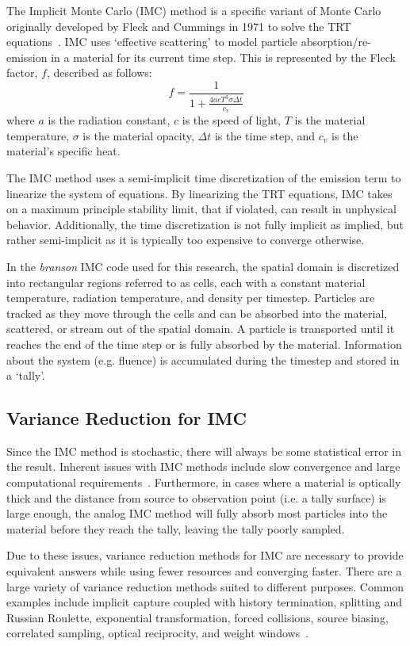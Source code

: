 The Implicit Monte Carlo (IMC) method is a specific variant of Monte Carlo originally developed by Fleck and Cummings in 1971 to solve the TRT equations~\cite{FC71}. IMC uses `effective scattering' to model particle absorption/re-emission in a material for its current time step. This is represented by the Fleck factor, $f$, described as follows:
\begin{equation}
f = \frac{1}{1 + \frac{4acT^{3}\sigma \Delta t}{c_{v}}}
\end{equation}
where $a$ is the radiation constant, $c$ is the speed of light, $T$ is the material temperature, $\sigma$ is the material opacity, $\Delta t$ is the time step, and $c_{v}$ is the material's specific heat.

The IMC method uses a semi-implicit time discretization of the emission term to linearize the system of equations. By linearizing the TRT equations, IMC takes on a maximum principle stability limit, that if violated, can result in unphysical behavior. Additionally, the time discretization is not fully implicit as implied, but rather semi-implicit as it is typically too expensive to converge otherwise.

In the \textit{branson} IMC code used for this research, the spatial domain is discretized into rectangular regions referred to as cells, each with a constant material temperature, radiation temperature, and density per timestep. Particles are tracked as they move through the cells and can be absorbed into the material, scattered, or stream out of the spatial domain. A particle is transported until it reaches the end of the time step or is fully absorbed by the material. Information about the system (e.g. fluence) is accumulated during the timestep and stored in a `tally'.

\subsection{Variance Reduction for IMC} \label{Sec: variance reduction}
Since the IMC method is stochastic, there will always be some statistical error in the result. Inherent issues with IMC methods include slow convergence and large computational requirements~\cite{AW16}. Furthermore, in cases where a material is optically thick and the distance from source to observation point (i.e. a tally surface) is large enough, the analog IMC method will fully absorb most particles into the material before they reach the tally, leaving the tally poorly sampled.

Due to these issues, variance reduction methods for IMC are necessary to provide equivalent answers while using fewer resources and converging faster. There are a large variety of variance reduction methods suited to different purposes. Common examples include implicit capture coupled with history termination, splitting and Russian Roulette, exponential transformation, forced collisions, source biasing, correlated sampling, optical reciprocity, and weight windows~\cite{JL16}.


